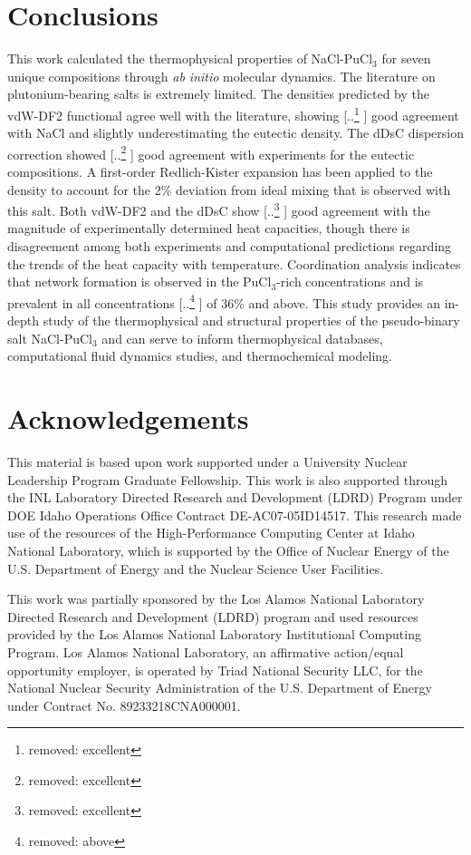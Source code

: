 \documentclass[review]{elsarticle}
\providecommand{\DIFaddtex}[1]{{\protect\color{blue} \sf #1}} %
\providecommand{\DIFdeltex}[1]{{\protect\color{red} [..\footnote{removed: #1} ]}} %
\providecommand{\DIFaddbegin}{} %
\providecommand{\DIFaddend}{} %
\providecommand{\DIFdelbegin}{} %
\providecommand{\DIFdelend}{} %
\providecommand{\DIFadd}[1]{\texorpdfstring{\DIFaddtex{#1}}{#1}} %
\providecommand{\DIFdel}[1]{\texorpdfstring{\DIFdeltex{#1}}{}} %
\newcommand{\DIFscaledelfig}{0.5}
\newlength{\DIFdelgraphicswidth} %
\newlength{\DIFdelgraphicsheight} %
\newcommand{\DIFaddincludegraphics}[2][]{{\color{blue}\fbox{\DIFOincludegraphics[#1]{#2}}}} %
\newcommand{\DIFdelincludegraphics}[2][]{%
\sbox{\DIFdelgraphicsbox}{\DIFOincludegraphics[#1]{#2}}%
\settoboxwidth{\DIFdelgraphicswidth}{\DIFdelgraphicsbox} %
\settoboxtotalheight{\DIFdelgraphicsheight}{\DIFdelgraphicsbox} %
\scalebox{\DIFscaledelfig}{%
\parbox[b]{\DIFdelgraphicswidth}{\usebox{\DIFdelgraphicsbox}\\[-\baselineskip] \rule{\DIFdelgraphicswidth}{0em}}\llap{\resizebox{\DIFdelgraphicswidth}{\DIFdelgraphicsheight}{%
\setlength{\unitlength}{\DIFdelgraphicswidth}%
\begin{picture}(1,1)%
\thicklines\linethickness{2pt} %
{\color[rgb]{1,0,0}\put(0,0){\framebox(1,1){}}}%
{\color[rgb]{1,0,0}\put(0,0){\line( 1,1){1}}}%
{\color[rgb]{1,0,0}\put(0,1){\line(1,-1){1}}}%
\end{picture}%
}\hspace*{3pt}}} %
} %
\DeclareRobustCommand{\DIFaddbegin}{\DIFOaddbegin \let\includegraphics\DIFaddincludegraphics} %
\DeclareRobustCommand{\DIFaddend}{\DIFOaddend \let\includegraphics\DIFOincludegraphics} %
\DeclareRobustCommand{\DIFdelbegin}{\DIFOdelbegin \let\includegraphics\DIFdelincludegraphics} %
\DeclareRobustCommand{\DIFdelend}{\DIFOaddend \let\includegraphics\DIFOincludegraphics} %
\begin{document}
\section{Conclusions}
This work calculated the thermophysical properties of NaCl-PuCl$_3$ for seven unique compositions through \textit{ab initio} molecular dynamics. The literature on plutonium-bearing salts is extremely limited. The densities predicted by the vdW-DF2 functional agree well with the literature, showing \DIFdelbegin \DIFdel{excellent }\DIFdelend \DIFaddbegin \DIFadd{good }\DIFaddend agreement with NaCl and slightly underestimating the eutectic density. The dDsC dispersion correction showed \DIFdelbegin \DIFdel{excellent }\DIFdelend \DIFaddbegin \DIFadd{good }\DIFaddend agreement with experiments for the eutectic compositions. A first-order Redlich-Kister expansion has been applied to the density to account for the 2\% deviation from ideal mixing that is observed with this salt. Both vdW-DF2 and the dDsC show \DIFdelbegin \DIFdel{excellent }\DIFdelend \DIFaddbegin \DIFadd{good }\DIFaddend agreement with the magnitude of experimentally determined heat capacities, though there is disagreement among both experiments and computational predictions regarding the trends of the heat capacity with temperature. Coordination analysis indicates that network formation is observed in the PuCl$_3$-rich concentrations and is prevalent in all concentrations \DIFdelbegin \DIFdel{above }\DIFdelend \DIFaddbegin \DIFadd{of }\DIFaddend 36\% \DIFaddbegin \DIFadd{and above}\DIFaddend . This study provides an in-depth study of the thermophysical and structural properties of the pseudo-binary salt NaCl-PuCl$_3$ and can serve to inform thermophysical databases, computational fluid dynamics studies, and thermochemical modeling.

\section{Acknowledgements} 

This material is based upon work supported under a University Nuclear Leadership Program Graduate Fellowship. This work is also supported through the INL Laboratory Directed Research and Development (LDRD) Program under DOE Idaho Operations Office Contract DE-AC07-05ID14517. This research made use of the resources of the High-Performance Computing Center at Idaho National Laboratory, which is supported by the Office of Nuclear Energy of the U.S. Department of Energy and the Nuclear Science User Facilities.  

This work was partially sponsored by the Los Alamos National Laboratory Directed Research and Development (LDRD) program and used resources provided by the Los Alamos National Laboratory Institutional Computing Program. Los Alamos National Laboratory, an affirmative action/equal opportunity employer, is operated by Triad National Security LLC, for the National Nuclear Security Administration of the U.S. Department of Energy under Contract No. 89233218CNA000001.

\FloatBarrier


\end{document}
